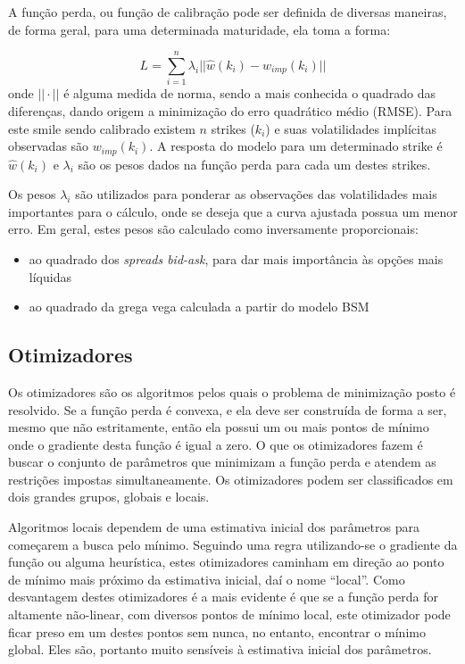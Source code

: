 \documentclass[]{book}
\providecommand{\tightlist}{%
  \setlength{\itemsep}{0pt}\setlength{\parskip}{0pt}}
\begin{document}
A função perda, ou função de calibração pode ser definida de diversas
maneiras, de forma geral, para uma determinada maturidade, ela toma a
forma:

\[L=\sum\limits_{i=1}^n\lambda_i||\hat w(k_i)-w_{imp}(k_i)||\] onde
\(||\cdot||\) é alguma medida de norma, sendo a mais conhecida o
quadrado das diferenças, dando origem a minimização do erro quadrático
médio (RMSE). Para este smile sendo calibrado existem \(n\) strikes
(\(k_i\)) e suas volatilidades implícitas observadas são
\(w_{imp}(k_i)\). A resposta do modelo para um determinado strike é
\(\hat w(k_i)\) e \(\lambda_i\) são os pesos dados na função perda para
cada um destes strikes.

Os pesos \(\lambda_i\) são utilizados para ponderar as observações das
volatilidades mais importantes para o cálculo, onde se deseja que a
curva ajustada possua um menor erro. Em geral, estes pesos são calculado
como inversamente proporcionais:

\begin{itemize}
\tightlist
\item
  ao quadrado dos \emph{spreads bid-ask}, para dar mais importância às
  opções mais líquidas
\item
  ao quadrado da grega vega calculada a partir do modelo BSM
\end{itemize}

\subsection{Otimizadores}\label{otimizadores}

Os otimizadores são os algoritmos pelos quais o problema de minimização
posto é resolvido. Se a função perda é convexa, e ela deve ser
construída de forma a ser, mesmo que não estritamente, então ela possui
um ou mais pontos de mínimo onde o gradiente desta função é igual a
zero. O que os otimizadores fazem é buscar o conjunto de parâmetros que
minimizam a função perda e atendem as restrições impostas
simultaneamente. Os otimizadores podem ser classificados em dois grandes
grupos, globais e locais.

Algoritmos locais dependem de uma estimativa inicial dos parâmetros para
começarem a busca pelo mínimo. Seguindo uma regra utilizando-se o
gradiente da função ou alguma heurística, estes otimizadores caminham em
direção ao ponto de mínimo mais próximo da estimativa inicial, daí o
nome ``local''. Como desvantagem destes otimizadores é a mais evidente é
que se a função perda for altamente não-linear, com diversos pontos de
mínimo local, este otimizador pode ficar preso em um destes pontos sem
nunca, no entanto, encontrar o mínimo global. Eles são, portanto muito
sensíveis à estimativa inicial dos parâmetros.
\end{document}
